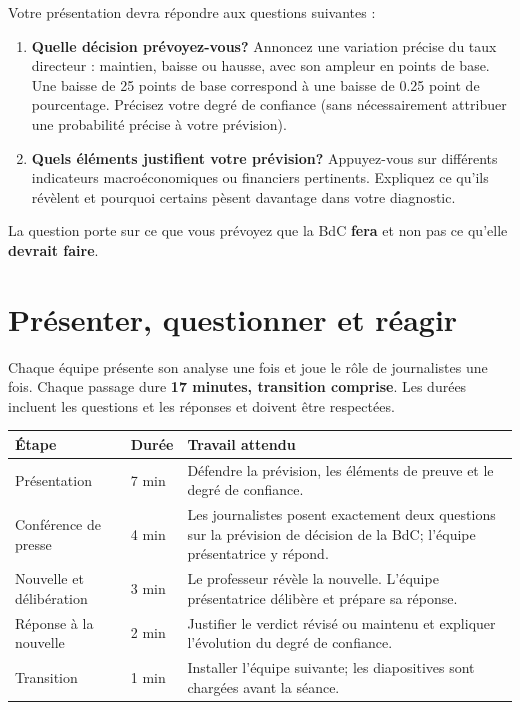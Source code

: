 \documentclass[11pt,letterpaper]{article}
\begin{document}
Votre présentation devra répondre aux questions suivantes :
\begin{enumerate}
  \item \textbf{Quelle décision prévoyez-vous?} Annoncez une variation précise du taux directeur : maintien, baisse ou hausse, avec son ampleur en points de base. Une baisse de 25 points de base correspond à une baisse de 0.25 point de pourcentage. Précisez votre degré de confiance (sans nécessairement attribuer une probabilité précise à votre prévision).
  \item \textbf{Quels éléments justifient votre prévision?} Appuyez-vous sur différents indicateurs macroéconomiques ou financiers pertinents. Expliquez ce qu'ils révèlent et pourquoi certains pèsent davantage dans votre diagnostic.
\end{enumerate}
La question porte sur ce que vous prévoyez que la BdC \textbf{fera} et non pas ce qu'elle \textbf{devrait faire}.

\par
\endgroup

\vspace{1cm}
\section{Présenter, questionner et réagir}
Chaque équipe présente son analyse une fois et joue le rôle de journalistes une fois. Chaque passage dure \textbf{17 minutes, transition comprise}. Les durées incluent les questions et les réponses et doivent être respectées.

\begin{tabularx}{\textwidth}{@{}>{\raggedright\arraybackslash}p{3.1cm}p{1.4cm}Y@{}}
\toprule
\textbf{Étape} & \textbf{Durée} & \textbf{Travail attendu} \\
\midrule
Présentation & 7 min & Défendre la prévision, les éléments de preuve et le degré de confiance. \\
\addlinespace[4pt]
Conférence de presse & 4 min & Les journalistes posent exactement deux questions sur la prévision de décision de la BdC; l'équipe présentatrice y répond. \\
\addlinespace[4pt]
Nouvelle et délibération & 3 min & Le professeur révèle la nouvelle. L'équipe présentatrice délibère et prépare sa réponse. \\
\addlinespace[4pt]
Réponse à la nouvelle & 2 min & Justifier le verdict révisé ou maintenu et expliquer l'évolution du degré de confiance. \\
\addlinespace[4pt]
Transition & 1 min & Installer l'équipe suivante; les diapositives sont chargées avant la séance. \\
\bottomrule
\end{tabularx}
\end{document}
